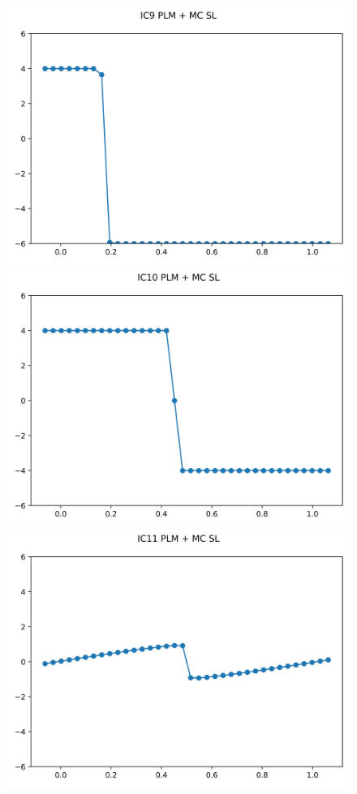 \documentclass{article}
\begin{document}
\begin{figure}[t]
        \includegraphics[width=.95\textwidth]{../../code/unsafe_IC9Methodpo_plot.png}
        \includegraphics[width=.95\textwidth]{../../code/unsafe_IC10Methodpo_plot.png}
        \includegraphics[width=.95\textwidth]{../../code/unsafe_IC11Methodpo_plot.png}

\end{figure}
\end{document}
